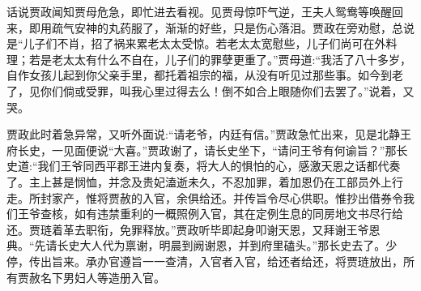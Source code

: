


\begin{parag}
    话说贾政闻知贾母危急，即忙进去看视。见贾母惊吓气逆，王夫人鸳鸯等唤醒回来，即用疏气安神的丸药服了，渐渐的好些，只是伤心落泪。贾政在旁劝慰，总说是“儿子们不肖，招了祸来累老太太受惊。若老太太宽慰些，儿子们尚可在外料理；若是老太太有什么不自在，儿子们的罪孽更重了。”贾母道:“我活了八十多岁，自作女孩儿起到你父亲手里，都托着祖宗的福，从没有听见过那些事。如今到老了，见你们倘或受罪，叫我心里过得去么！倒不如合上眼随你们去罢了。”说着，又哭。
\end{parag}


\begin{parag}
    贾政此时着急异常，又听外面说:“请老爷，内廷有信。”贾政急忙出来，见是北静王府长史，一见面便说“大喜。”贾政谢了，请长史坐下，“请问王爷有何谕旨？”那长史道:“我们王爷同西平郡王进内复奏，将大人的惧怕的心，感激天恩之话都代奏了。主上甚是悯恤，并念及贵妃溘逝未久，不忍加罪，着加恩仍在工部员外上行走。所封家产，惟将贾赦的入官，余俱给还。并传旨令尽心供职。惟抄出借券令我们王爷查核，如有违禁重利的一概照例入官，其在定例生息的同房地文书尽行给还。贾琏着革去职衔，免罪释放。”贾政听毕即起身叩谢天恩，又拜谢王爷恩典。“先请长史大人代为禀谢，明晨到阙谢恩，并到府里磕头。”那长史去了。少停，传出旨来。承办官遵旨一一查清，入官者入官，给还者给还，将贾琏放出，所有贾赦名下男妇人等造册入官。
\end{parag}


